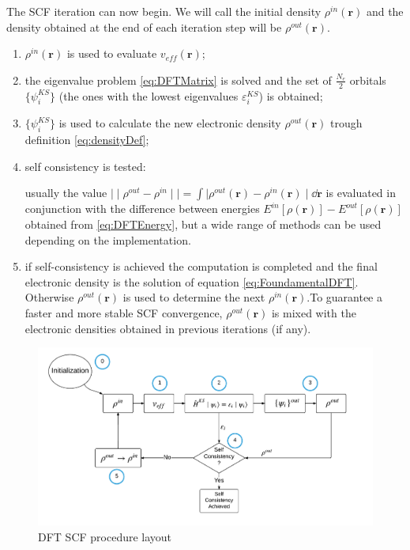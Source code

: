 \documentclass[a4paper,12pt]{article}
\newcommand\dens{\rho(\mathbf{r})}
\newcommand\erre{\mathbf{r}}
\begin{document}
The SCF iteration can now begin. 
We will call the initial density $\rho^{in}(\erre)$ and  the density obtained at the end of each iteration step will be $\rho^{out}(\erre)$.


\begin{enumerate}
	\item $\rho^{in}(\erre)$ is used to evaluate $v_{eff}(\erre)$;
	\item the eigenvalue problem \eqref{eq:DFTMatrix} is solved and the set of $\frac{N_{e}}{2}$ orbitals $\{ \psi^{KS}_i \}$  (the ones with the lowest eigenvalues $\varepsilon^{KS}_i$) is obtained; \label{en:SCFDiag}
	\item $\{ \psi^{KS}_i \}$ is used to calculate the new electronic density $\rho^{out}(\erre)$ trough definition \eqref{eq:densityDef};
	\item self consistency is tested: 
	
	usually the value $\mid\mid \rho^{out} - \rho^{in} \mid\mid = \int \mid \rho^{out}(\erre) - \rho^{in}(\erre)\mid \dd{\erre} $ is evaluated in conjunction with the difference between energies $E^{in}[\dens] - E^{out}[\dens]$ obtained from \eqref{eq:DFTEnergy}, but a wide range of methods can be used depending on the implementation. 
	\item if self-consistency is achieved the computation is completed and the final electronic density is the solution of equation \eqref{eq:FoundamentalDFT}. Otherwise $\rho^{out}(\erre)$ is used to determine the next $\rho^{in}(\erre)$.To guarantee a faster and more stable SCF convergence, $\rho^{out}(\erre)$ is mixed with the electronic densities obtained in previous iterations (if any).
\end{enumerate}


\begin{figure}[h]
	\begin{framed}
			\includegraphics[width=\linewidth]{SCF-DFT_schema.pdf}	
	\end{framed}
	\caption{DFT SCF procedure layout}
	\label{fig:SCF-DFT}
\end{figure}
\end{document}

